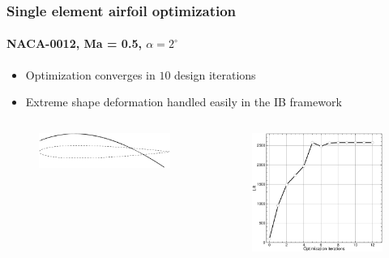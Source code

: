 
\begin{frame}
  \frametitle{Single element airfoil optimization}
  \framesubtitle{NACA-0012, Ma = 0.5, $\alpha=2^\circ$}
  \begin{itemize}
  \item Optimization converges in $10$ design iterations
  \item Extreme shape deformation handled easily in the IB framework
  \end{itemize}
   \begin{columns}
    \begin{column}{0.5\textwidth}
      \begin{figure}
        \centering
        \includegraphics[width=1.0\textwidth]{Fig/naca_def}
      \end{figure}
    \end{column}
    \begin{column}{0.5\textwidth}
      \begin{figure}
        \centering
        \includegraphics[width=1.0\textwidth]{Fig/L_naca}
      \end{figure}
    \end{column}      
  \end{columns}
\end{frame}

